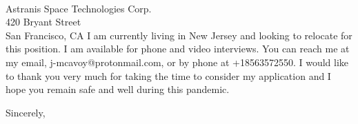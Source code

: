 \documentclass[11pt]{letter} %
\begin{document}
\begin{letter}{\\
Astranis Space Technologies Corp.\\
420 Bryant Street\\
San Francisco, CA}
I am currently living in New Jersey and looking to relocate for this position. I
am available for phone and video interviews. You can reach me at my email,
j-mcavoy@protonmail.com, or by phone at +18563572550. I would like to thank you
very much for taking the time to consider my application and I hope you remain safe
and well during this pandemic.

\closing{Sincerely,}




\end{letter}
\end{document}
